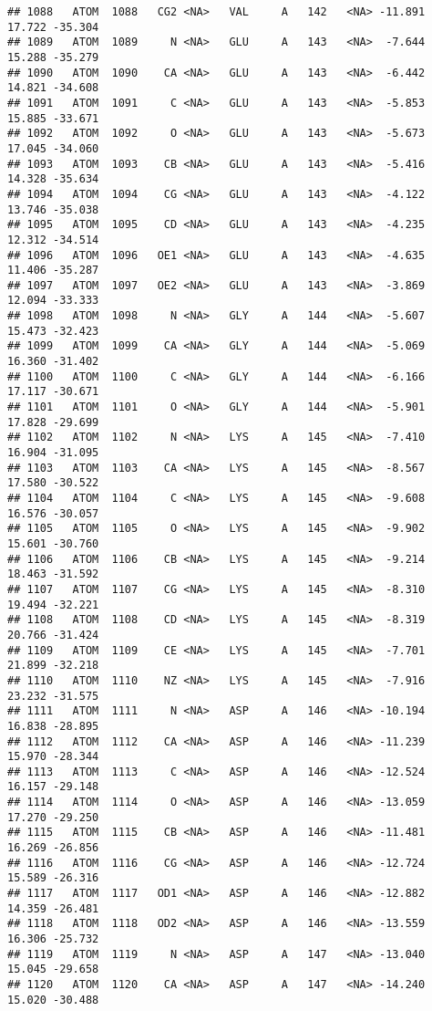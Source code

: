 \documentclass[
]{article}
\begin{document}
\begin{verbatim}
## 1088   ATOM  1088   CG2 <NA>   VAL     A   142   <NA> -11.891  17.722 -35.304
## 1089   ATOM  1089     N <NA>   GLU     A   143   <NA>  -7.644  15.288 -35.279
## 1090   ATOM  1090    CA <NA>   GLU     A   143   <NA>  -6.442  14.821 -34.608
## 1091   ATOM  1091     C <NA>   GLU     A   143   <NA>  -5.853  15.885 -33.671
## 1092   ATOM  1092     O <NA>   GLU     A   143   <NA>  -5.673  17.045 -34.060
## 1093   ATOM  1093    CB <NA>   GLU     A   143   <NA>  -5.416  14.328 -35.634
## 1094   ATOM  1094    CG <NA>   GLU     A   143   <NA>  -4.122  13.746 -35.038
## 1095   ATOM  1095    CD <NA>   GLU     A   143   <NA>  -4.235  12.312 -34.514
## 1096   ATOM  1096   OE1 <NA>   GLU     A   143   <NA>  -4.635  11.406 -35.287
## 1097   ATOM  1097   OE2 <NA>   GLU     A   143   <NA>  -3.869  12.094 -33.333
## 1098   ATOM  1098     N <NA>   GLY     A   144   <NA>  -5.607  15.473 -32.423
## 1099   ATOM  1099    CA <NA>   GLY     A   144   <NA>  -5.069  16.360 -31.402
## 1100   ATOM  1100     C <NA>   GLY     A   144   <NA>  -6.166  17.117 -30.671
## 1101   ATOM  1101     O <NA>   GLY     A   144   <NA>  -5.901  17.828 -29.699
## 1102   ATOM  1102     N <NA>   LYS     A   145   <NA>  -7.410  16.904 -31.095
## 1103   ATOM  1103    CA <NA>   LYS     A   145   <NA>  -8.567  17.580 -30.522
## 1104   ATOM  1104     C <NA>   LYS     A   145   <NA>  -9.608  16.576 -30.057
## 1105   ATOM  1105     O <NA>   LYS     A   145   <NA>  -9.902  15.601 -30.760
## 1106   ATOM  1106    CB <NA>   LYS     A   145   <NA>  -9.214  18.463 -31.592
## 1107   ATOM  1107    CG <NA>   LYS     A   145   <NA>  -8.310  19.494 -32.221
## 1108   ATOM  1108    CD <NA>   LYS     A   145   <NA>  -8.319  20.766 -31.424
## 1109   ATOM  1109    CE <NA>   LYS     A   145   <NA>  -7.701  21.899 -32.218
## 1110   ATOM  1110    NZ <NA>   LYS     A   145   <NA>  -7.916  23.232 -31.575
## 1111   ATOM  1111     N <NA>   ASP     A   146   <NA> -10.194  16.838 -28.895
## 1112   ATOM  1112    CA <NA>   ASP     A   146   <NA> -11.239  15.970 -28.344
## 1113   ATOM  1113     C <NA>   ASP     A   146   <NA> -12.524  16.157 -29.148
## 1114   ATOM  1114     O <NA>   ASP     A   146   <NA> -13.059  17.270 -29.250
## 1115   ATOM  1115    CB <NA>   ASP     A   146   <NA> -11.481  16.269 -26.856
## 1116   ATOM  1116    CG <NA>   ASP     A   146   <NA> -12.724  15.589 -26.316
## 1117   ATOM  1117   OD1 <NA>   ASP     A   146   <NA> -12.882  14.359 -26.481
## 1118   ATOM  1118   OD2 <NA>   ASP     A   146   <NA> -13.559  16.306 -25.732
## 1119   ATOM  1119     N <NA>   ASP     A   147   <NA> -13.040  15.045 -29.658
## 1120   ATOM  1120    CA <NA>   ASP     A   147   <NA> -14.240  15.020 -30.488

\end{verbatim}
\end{document}
